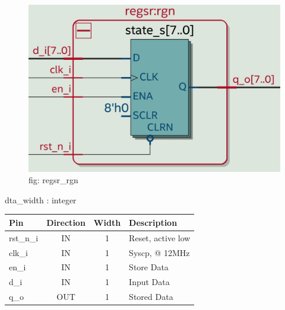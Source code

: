 \documentclass[12pt,a4 paper] {report}
\begin{document}
\begin{figure}[h]
	\centering	
	\includegraphics[scale=0.2]{../png/regsr_rgn.png}
	\newline
	fig: regsr\_rgn\\
\end{figure}
dta\_width : integer\\
\begin{center}
	\begin{tabular}{ | p{2cm} | c | c | p{5cm} |}
		\hline
		\textbf{Pin} & \textbf{Direction} & \textbf{Width} & \textbf{Description} \\
		\hline	
 		rst\_n\_i & IN & 1 & Reset, active low \\
 		\hline
		clk\_i & IN & 1 & Syscp, @ 12MHz \\
		\hline
		en\_i & IN & 1 & Store Data \\
		\hline
		d\_i & IN & 1 & Input Data \\
		\hline
		q\_o & OUT & 1 & Stored Data \\
		\hline
		
	\end{tabular}
\end{center}



\newpage
\end{document}
